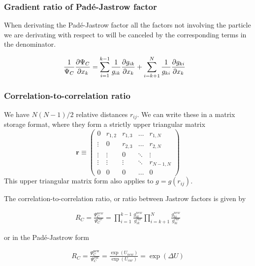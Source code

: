 \documentclass[11pt]{article}
\begin{document}
		\subsubsection{Gradient ratio of  Padé-Jastrow factor }

			When derivating the Padé-Jastrow factor all the factors not involving the particle we are derivating with respect to will be canceled by the corresponding terms in the denominator.

			\begin{align}
				\frac{1}{\Psi_C}\pdv{\Psi_C}{x_k} &= \sum_{i=1}^{k-1}\frac{1}{g_{ik}}\pdv{g_{ik}}{x_k} +  \sum_{i=k+1}^{N}\frac{1}{g_{ki}}\pdv{g_{ki}}{x_k}
			\end{align}

		\subsubsection{Correlation-to-correlation ratio}

			We have $N\left(N-1\right)/2$ relative distances $r_{ij}$. We can
			write these in a matrix storage format, where they form a strictly
			upper triangular matrix
			\[
			\mathbf{r}\equiv\left(\begin{array}{ccccc}
			0 & r_{1,2} & r_{1,3} & \dots & r_{1,N}\\
			\vdots & 0 & r_{2,3} & \dots & r_{2,N}\\
			\vdots & \vdots & 0 & \ddots & \vdots\\
			\vdots & \vdots & \vdots & \ddots & r_{N-1,N}\\
			0 & 0 & 0 & \dots & 0
			\end{array}\right)
			\]
			This upper triangular matrix form also applies to $g=g\left(r_{ij}\right)$.

			The correlation-to-correlation ratio, or ratio between Jastrow factors
			is given by

			\begin{align}
				R_{C}=\frac{\Psi_{C}^{new}}{\Psi_{C}^{cur}}=\prod_{i=1}^{k-1}\frac{g_{ik}^{new}}{g_{ik}^{cur}}\prod_{i=k+1}^{N}\frac{g_{ki}^{new}}{g_{ki}^{cur}}
			\end{align}

			or in the Padé-Jastrow form

			\begin{align}
				R_{C}=\frac{\Psi_{C}^{\mathrm{new}}}{\Psi_{C}^{\mathrm{cur}}}=\frac{\exp\left(U_{new}\right)}{\exp\left(U_{cur}\right)}=\exp\left(\Delta U\right)
			\end{align}
\end{document}
